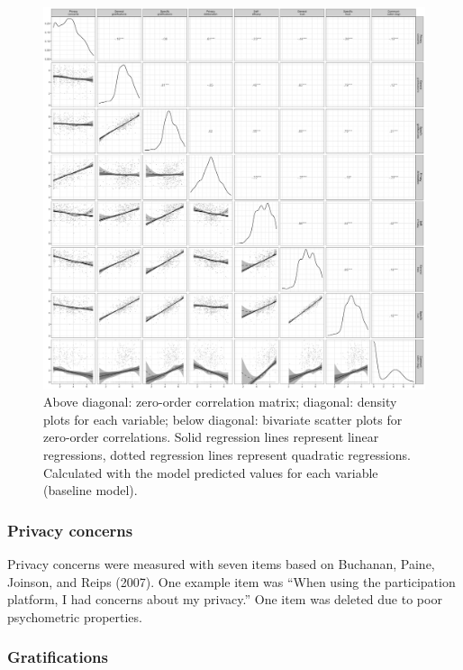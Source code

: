 \documentclass[
  english,
  man,floatsintext]{apa6}
\begin{document}
\begin{figure}[!h]

{\centering \includegraphics[width=.9\textwidth]{figures/results/cor_plot} 

}

\caption{Above diagonal: zero-order correlation matrix; diagonal: density plots for each variable; below diagonal: bivariate scatter plots for zero-order correlations. Solid regression lines represent linear regressions, dotted regression lines represent quadratic regressions. Calculated with the model predicted values for each variable (baseline model).}\label{fig:corrplot}
\end{figure}

\hypertarget{privacy-concerns}{%
\subsubsection{Privacy concerns}\label{privacy-concerns}}

Privacy concerns were measured with seven items based on Buchanan, Paine, Joinson, and Reips (2007).
One example item was ``When using the participation platform, I had concerns about my privacy.''
One item was deleted due to poor psychometric properties.

\hypertarget{gratifications}{%
\subsubsection{Gratifications}\label{gratifications}}
\end{document}
